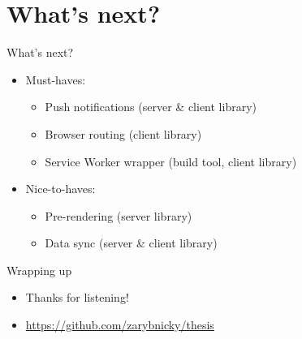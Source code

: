 \documentclass[presentation]{beamer}
\begin{document}
\section{What's next?}
\label{sec:org2e686fb}
\begin{frame}[label={sec:org5838b79}]{What's next?}
\begin{itemize}
\item Must-haves:
\begin{itemize}
\item Push notifications (server \& client library)
\item Browser routing (client library)
\item Service Worker wrapper (build tool, client library)
\end{itemize}
\end{itemize}
\pause
\begin{itemize}
\item Nice-to-haves:
\begin{itemize}
\item Pre-rendering (server library)
\item Data sync (server \& client library)
\end{itemize}
\end{itemize}
\end{frame}

\begin{frame}[label={sec:org0aeb044}]{Wrapping up}
\begin{itemize}
\item Thanks for listening!
\end{itemize}

\begin{itemize}
\item \url{https://github.com/zarybnicky/thesis}
\end{itemize}
\end{frame}
\end{document}
